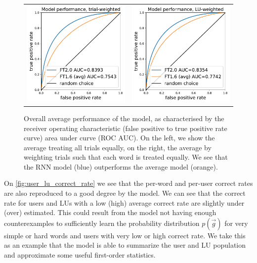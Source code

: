 \begin{figure}[ht]
\centering
\begin{tabular}{cc}
\includegraphics[width=0.4\linewidth]{figures/lingvist/roc_trial.pdf} &
\includegraphics[width=0.4\linewidth]{figures/lingvist/roc_lu.pdf} \\
\end{tabular}
\caption{Overall average performance of the model, as characterised by the receiver operating characteristic (false positive to true positive rate curve) area under curve (ROC AUC). On the left, we show the average treating all trials equally, on the right, the average by weighting trials such that each word is treated equally. We see that the RNN model (blue) outperforms the average model (orange).} 
\label{fig:roc} 
\end{figure} 

On \cref{fig:user_lu_correct_rate} we see that the per-word and per-user correct rates are also reproduced to a good degree by the model. We can see that the correct rate for users and LUs with a low (high) average correct rate are slightly under (over) estimated. This could result from the model not having enough counterexamples to sufficiently learn the probability distribution $p(\vec{g})$ for very simple or hard words and users with very low or high correct rate. We take this as an example that the model is able to summarize the user and LU population and approximate some useful first-order statistics.

